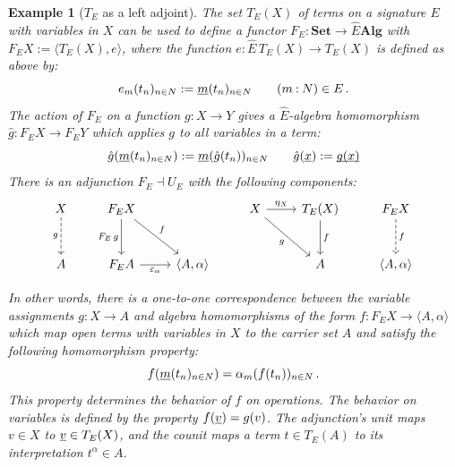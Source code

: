 \documentclass[11pt,oneside]{book}
\newtheorem{example}[theorem]{Example}
\theoremstyle{definition}
\newcommand{\ul}[1]{%
  \underline{\smash{#1}}
}
\begin{document}
\begin{example}[$T_E$ as a left adjoint] %
The set $T_E(X)$ of terms on a signature $E$ with variables in $X$
can be used to define a functor
$F_E : \mathbf{Set} \rightarrow \hat{E} \mathbf{Alg}$
with $F_E X := \langle T_E(X), e \rangle$,
where the function
$e : \hat{E} \, T_E(X) \rightarrow T_E(X)$
is defined as above by:
\[
  e_m(t_n)_{n \in N} := \ul{m}(t_n)_{n \in N}
  \qquad
  (m \mathbin{:} N) \in E
  \,.
\]
The action of $F_E$ on a function $g : X \rightarrow Y$
gives a $\hat{E}$-algebra homomorphism
$\hat{g} : F_E X \rightarrow F_E Y$
which applies $g$ to all variables in a term:
\[
  \hat{g}(\ul{m}(t_n)_{n \in N}) := \ul{m}(\hat{g}(t_n))_{n \in N}
  \qquad
  \hat{g}(\ul{x}) := \ul{g(x)}
\]
There is an adjunction $F_E \dashv U_E$
with the following components:
\[
  \begin{tikzcd}[row sep=large]
    X \ar[d, "g"', dashed] &
    F_E X \ar[d, "F_E \, g"'] \ar[dr, "f"] &
    &
    X \ar[r, "\eta_X"] \ar[dr, "g"'] &
    T_E(X) \ar[d, "f"] &
    F_E X \ar[d, "f", dashed]
    \\
    A &
    F_E A \ar[r, "\varepsilon_\alpha"'] &
    \langle A, \alpha \rangle &
    &
    A &
    \langle A, \alpha \rangle
  \end{tikzcd}
\]

In other words,
there is a one-to-one correspondence between
the variable assignments
$g : X \rightarrow A$
and algebra homomorphisms of the form
$f : F_E X \rightarrow \langle A, \alpha \rangle$
which map open terms with variables in $X$ to
the carrier set $A$
and satisfy
the following homomorphism property:
\[
  f(\ul{m}(t_n)_{n \in N}) = \alpha_m(f(t_n))_{n \in N}
  \,.
\]
This property determines the behavior of $f$ on operations.
The behavior on variables
is defined by the property $f(\ul{v}) = g(v)$.
The adjunction's unit maps $v \in X$ to $\ul{v} \in T_E(X)$,
and the counit maps a term $t \in T_E(A)$
to its interpretation $t^\alpha \in A$.
\end{example}
\end{document}
